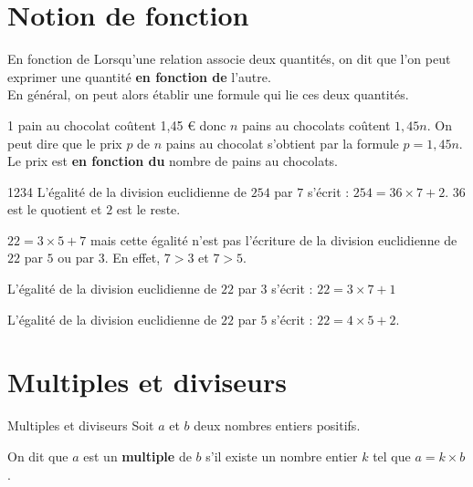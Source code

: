 \begin{pageCours}




\section{Notion de fonction}


\begin{DefT}{En fonction de}
Lorsqu'une relation associe deux quantités, on dit que l'on peut exprimer une quantité \textbf{en fonction de} l'autre. \\ En général, on peut alors établir une formule qui lie ces deux quantités.
\end{DefT}

\begin{Ex}
1 pain au chocolat coûtent 1,45 \euro{} donc $n$ pains au chocolats coûtent $1,45n$. On peut dire que le prix $p$ de $n$ pains au chocolat s'obtient par la formule $p=1,45n$. Le prix est \textbf{en fonction du} nombre de pains au chocolats.
\end{Ex}




\begin{ExQr}{1234}
L'égalité de la division euclidienne de $254$ par $7$ s'écrit : $254 = 36 \times 7 +2$. $36$ est le quotient et $2$ est le reste.
\end{ExQr}


\begin{Att}

$22 = 3 \times 5 +7$ mais cette égalité n'est pas l'écriture de la division euclidienne de $22$ par $5$ ou par $3$. En effet, $7 > 3$ et $7 > 5$.

L'égalité de la division euclidienne de $22$ par $3$ s’écrit : $22 = 3 \times 7 +1$

L'égalité de la division euclidienne de $22$ par $5$ s’écrit : $22 = 4 \times 5 +2$.
\end{Att}

\section{Multiples et diviseurs}

 
  

\begin{DefT}{Multiples et diviseurs}
 Soit $a$ et $b$ deux nombres entiers positifs. 
 
 On dit que $a$ est un \textbf{multiple} de $b$ s'il existe un nombre entier $k$ tel que $a = k \times b$.
 

\end{DefT}
\end{pageCours}
